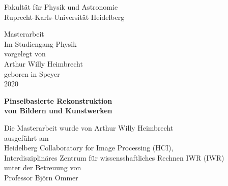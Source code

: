 
\thispagestyle{empty}
\begin{center}
  \renewcommand{\baselinestretch}{2.00}
  \Large\sffamily
  Fakult\"{a}t f\"{u}r Physik und Astronomie\\
  \large
  Ruprecht-Karls-Universit\"{a}t Heidelberg
  \par\vfill\normalfont
  Masterarbeit\\
  Im Studiengang Physik\\
  vorgelegt von\\
  Arthur Willy Heimbrecht\\
    geboren in Speyer\\
  2020\\
\end{center}
\newpage

\thispagestyle{empty}
\begin{center}
  \renewcommand{\baselinestretch}{2.00}
  \Large\bfseries\sffamily
    Pinselbasierte Rekonstruktion \\
    von Bildern und Kunstwerken
  \par
  \vfill
  \large\normalfont
  Die Masterarbeit wurde von Arthur Willy Heimbrecht\\
  ausgef\"{u}hrt am\\
  Heidelberg Collaboratory for Image Processing (HCI),\\
  Interdisziplinäres Zentrum für wissensshaftliches Rechnen IWR (IWR)\\
  unter der Betreuung von\\
  Professor Björn Ommer
\end{center}\par
\vspace{5\baselineskip}

\renewcommand{\baselinestretch}{1.00}\normalsize
